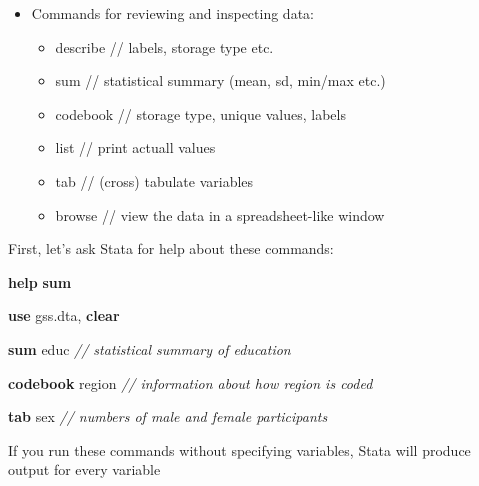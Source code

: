 \documentclass[
]{book}
\newenvironment{Shaded}{\begin{snugshade}}{\end{snugshade}}
\newcommand{\CommentTok}[1]{\textcolor[rgb]{0.56,0.35,0.01}{\textit{#1}}}
\newcommand{\KeywordTok}[1]{\textcolor[rgb]{0.13,0.29,0.53}{\textbf{#1}}}
\newcommand{\NormalTok}[1]{#1}
\providecommand{\tightlist}{%
  \setlength{\itemsep}{0pt}\setlength{\parskip}{0pt}}
\begin{document}
\begin{itemize}
\tightlist
\item
  Commands for reviewing and inspecting data:

  \begin{itemize}
  \tightlist
  \item
    describe // labels, storage type etc.
  \item
    sum // statistical summary (mean, sd, min/max etc.)
  \item
    codebook // storage type, unique values, labels
  \item
    list // print actuall values
  \item
    tab // (cross) tabulate variables
  \item
    browse // view the data in a spreadsheet-like window
  \end{itemize}
\end{itemize}

First, let's ask Stata for help about these commands:

\begin{Shaded}
\begin{Highlighting}[]
\KeywordTok{help} \KeywordTok{sum}
\end{Highlighting}
\end{Shaded}

\begin{Shaded}
\begin{Highlighting}[]
\KeywordTok{use}\NormalTok{ gss.dta, }\KeywordTok{clear}

\KeywordTok{sum}\NormalTok{ educ }\CommentTok{// statistical summary of education}
\end{Highlighting}
\end{Shaded}

\begin{Shaded}
\begin{Highlighting}[]
\KeywordTok{codebook}\NormalTok{ region }\CommentTok{// information about how region is coded}
\end{Highlighting}
\end{Shaded}

\begin{Shaded}
\begin{Highlighting}[]
\KeywordTok{tab}\NormalTok{ sex }\CommentTok{// numbers of male and female participants}
\end{Highlighting}
\end{Shaded}

If you run these commands without specifying variables, Stata will produce output for every variable
\end{document}

